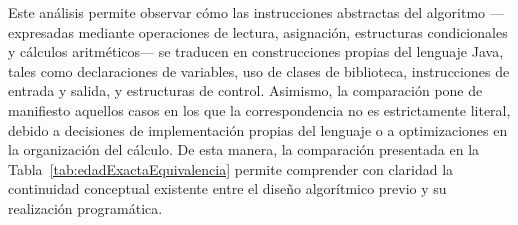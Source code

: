 \documentclass[12pt,twoside]{book}
\begin{document}
					Este análisis permite observar cómo las instrucciones abstractas del algoritmo —expresadas mediante operaciones de lectura, asignación, estructuras condicionales y cálculos aritméticos— se traducen en construcciones propias del lenguaje Java, tales como declaraciones de variables, uso de clases de biblioteca, instrucciones de entrada y salida, y estructuras de control. Asimismo, la comparación pone de manifiesto aquellos casos en los que la correspondencia no es estrictamente literal, debido a decisiones de implementación propias del lenguaje o a optimizaciones en la organización del cálculo. De esta manera, la comparación presentada en la Tabla~\ref{tab:edadExactaEquivalencia} permite comprender con claridad la continuidad conceptual existente entre el diseño algorítmico previo y su realización programática.
					
\end{document}
